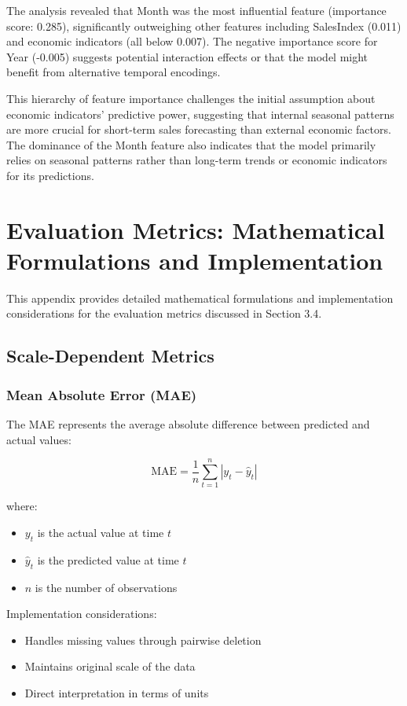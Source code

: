 \documentclass[12pt,a4paper]{report}
\begin{document}
The analysis revealed that Month was the most influential feature (importance score: 0.285), significantly outweighing other features including SalesIndex (0.011) and economic indicators (all below 0.007). The negative importance score for Year (-0.005) suggests potential interaction effects or that the model might benefit from alternative temporal encodings.

This hierarchy of feature importance challenges the initial assumption about economic indicators' predictive power, suggesting that internal seasonal patterns are more crucial for short-term sales forecasting than external economic factors. The dominance of the Month feature also indicates that the model primarily relies on seasonal patterns rather than long-term trends or economic indicators for its predictions.

\chapter{Evaluation Metrics: Mathematical Formulations and Implementation}
\label{appendix:metrics}

This appendix provides detailed mathematical formulations and implementation considerations for the evaluation metrics discussed in Section 3.4.

\section{Scale-Dependent Metrics}

\subsection{Mean Absolute Error (MAE)}
The MAE represents the average absolute difference between predicted and actual values:

\[
\text{MAE} = \frac{1}{n} \sum_{t=1}^{n} |y_t - \hat{y}_t|
\]

where:
\begin{itemize}
    \item \(y_t\) is the actual value at time \(t\)
    \item \(\hat{y}_t\) is the predicted value at time \(t\)
    \item \(n\) is the number of observations
\end{itemize}

Implementation considerations:
\begin{itemize}
    \item Handles missing values through pairwise deletion
    \item Maintains original scale of the data
    \item Direct interpretation in terms of units
\end{itemize}
\end{document}
